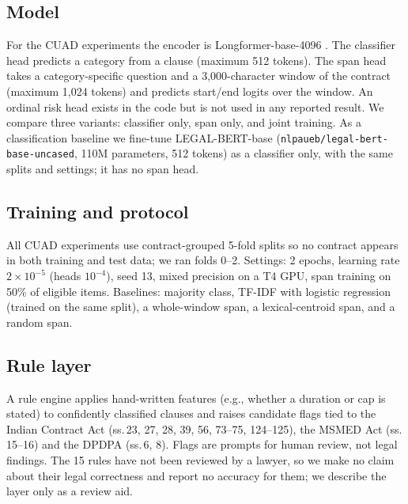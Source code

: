 \documentclass[conference]{IEEEtran}
\begin{document}
\subsection{Model}
For the CUAD experiments the encoder is Longformer-base-4096 \cite{beltagy2020longformer}. The classifier head predicts a category from a clause (maximum 512 tokens). The span head takes a category-specific question and a 3,000-character window of the contract (maximum 1,024 tokens) and predicts start/end logits over the window. An ordinal risk head exists in the code but is not used in any reported result. We compare three variants: classifier only, span only, and joint training. As a classification baseline we fine-tune LEGAL-BERT-base \cite{chalkidis2020legalbert} (\texttt{nlpaueb/legal-bert-base-uncased}, 110M parameters, 512 tokens) as a classifier only, with the same splits and settings; it has no span head.

\subsection{Training and protocol}
All CUAD experiments use contract-grouped 5-fold splits so no contract appears in both training and test data; we ran folds 0--2. Settings: 2 epochs, learning rate $2\times10^{-5}$ (heads $10^{-4}$), seed 13, mixed precision on a T4 GPU, span training on 50\% of eligible items. Baselines: majority class, TF-IDF with logistic regression (trained on the same split), a whole-window span, a lexical-centroid span, and a random span.

\subsection{Rule layer}
A rule engine applies hand-written features (e.g., whether a duration or cap is stated) to confidently classified clauses and raises candidate flags tied to the Indian Contract Act (ss.\,23, 27, 28, 39, 56, 73--75, 124--125), the MSMED Act (ss.\,15--16) and the DPDPA (ss.\,6, 8). Flags are prompts for human review, not legal findings. The 15 rules have not been reviewed by a lawyer, so we make no claim about their legal correctness and report no accuracy for them; we describe the layer only as a review aid.
\end{document}

